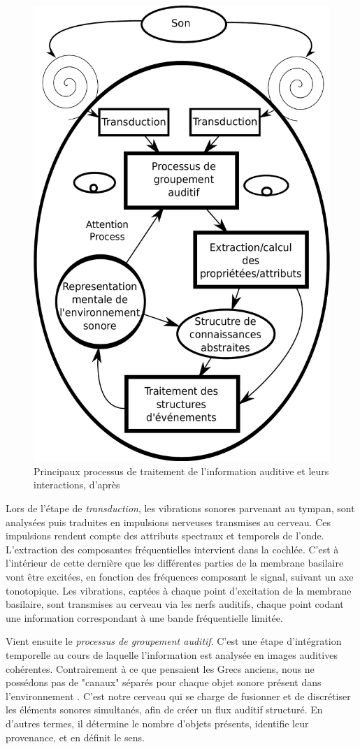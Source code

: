 \begin{figure}[t]
        \myfloatalign
        \includegraphics[width=.6\linewidth]{gfx/traitementSonMcAdamsBigand}
        \caption[Principaux processus de traitement de l'information auditive et leurs interactions]{Principaux processus de traitement de l'information auditive et leurs interactions, d'après \citep{mcadams1994penser}}\label{fig:traitementSonMcAdamsBigand}
\end{figure}

Lors de l'étape de \emph{transduction}, les vibrations sonores parvenant au tympan, sont analysées puis traduites en impulsions nerveuses transmises au cerveau. Ces impulsions rendent compte des attributs spectraux et temporels de l'onde. L'extraction des composantes fréquentielles intervient dans la cochlée. C'est à l'intérieur de cette dernière que les différentes parties de la membrane basilaire vont être excitées, en fonction des fréquences composant le signal, suivant un axe tonotopique. Les vibrations, captées à chaque point d’excitation de la membrane basilaire, sont transmises au cerveau via les nerfs auditifs, chaque point codant une information correspondant à une bande fréquentielle limitée. 

Vient ensuite le \emph{processus de groupement auditif}. C'est une étape d'intégration temporelle au cours de laquelle l'information est analysée en images auditives cohérentes. Contrairement à ce que pensaient les Grecs anciens, nous ne possédons pas de "canaux" séparés pour chaque objet sonore présent dans l'environnement \citep{yost1994fundamentals}. C'est notre cerveau qui se charge de fusionner et de discrétiser les éléments sonores simultanés, afin de créer un flux auditif structuré. En d'autres termes, il détermine le nombre d'objets présents, identifie leur provenance, et en définit le sens. 

